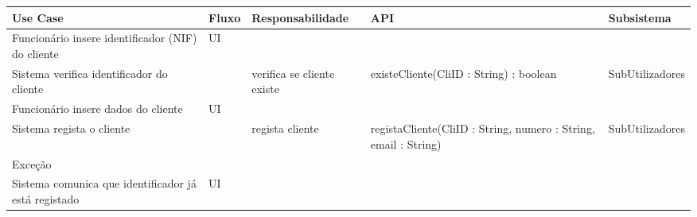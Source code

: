 \documentclass[../relatorio.tex]{subfiles}
\begin{document}
\begin{landscape}
    \begin{table}[!h]
        \centering
        \begin{tabular}{|p{5cm}|p{1cm}|p{4cm}|p{6cm}|p{3cm}|}
            \hline
            \rowcolor{gray!20!white}
            Use Case & Fluxo                                            & Responsabilidade & API & Subsistema \\
            \hline
            \rowcolor{yellow}
            Funcionário insere identificador (NIF) do cliente
                     & UI
                     & 
                     & 
                     & 
            \\
            \hline
            Sistema verifica identificador do cliente
                     & 
                     & verifica se cliente existe
                     & existeCliente(CliID : String) : boolean
                     & SubUtilizadores
            \\
            \hline
            \rowcolor{yellow}
            Funcionário insere dados do cliente
                     & UI
                     & 
                     & 
                     & 
            \\
            \hline
            Sistema regista o cliente
                     & 
                     & regista cliente
                     & registaCliente(CliID : String, numero : String, email : String)
                     & SubUtilizadores
            \\
            \hline
            \rowcolor{red!30}
            Exceção  &                                                  &                  &     &            \\
            \hline
            Sistema comunica que identificador já está registado
                     & UI
                     & 
                     & 
                     & 
            \\
            \hline
        \end{tabular}
    \end{table}
\end{landscape}
\end{document}
